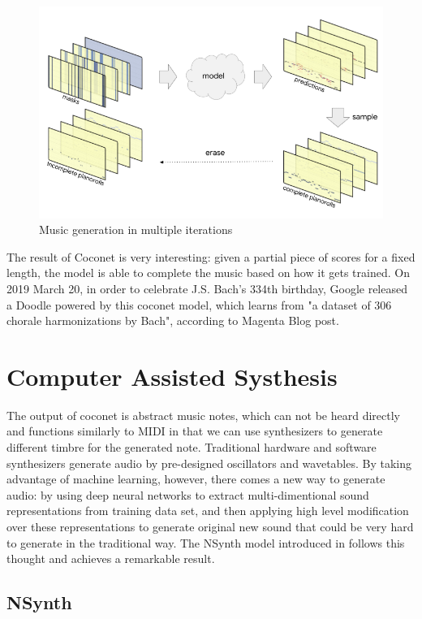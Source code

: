 \documentclass[jou]{apa6}
\begin{document}
\begin{figure}[h!]
    \includegraphics[width=\linewidth]{coconet.png}
    \caption{Music generation in multiple iterations}
    \label{fig:Figure1}
\end{figure}

The result of Coconet is very interesting: given a partial piece of scores for a fixed length, the model is able to complete the music based on how it gets trained. On 2019 March 20, in order to celebrate J.S. Bach's 334th birthday, Google released a Doodle powered by this coconet model, which learns from "a dataset of 306 chorale harmonizations by Bach", according to Magenta Blog post.

\section{Computer Assisted Systhesis}

The output of coconet is abstract music notes, which can not be heard directly and functions similarly to MIDI in that we can use synthesizers to generate different timbre for the generated note. Traditional hardware and software synthesizers generate audio by pre-designed oscillators and wavetables. By taking advantage of machine learning, however, there comes a new way to generate audio: by using deep neural networks to extract multi-dimentional sound representations from training data set, and then applying high level modification over these representations to generate original new sound that could be very hard to generate in the traditional way. The NSynth model introduced in \textcite{engel2017neural} follows this thought and achieves a remarkable result.

\subsection{NSynth}
\end{document}

